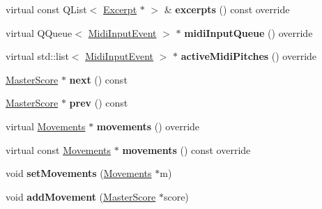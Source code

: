 \begin{DoxyCompactItemize}
\mbox{\label{class_ms_1_1_master_score_aeb1b90b68642106c2dad7449dc36b3de}} 
virtual const Q\+List$<$ \hyperlink{class_ms_1_1_excerpt}{Excerpt} $\ast$ $>$ \& {\bfseries excerpts} () const override
\item 
\mbox{\label{class_ms_1_1_master_score_a7d5f75c10fce6694d6ce139f7e2ab547}} 
virtual Q\+Queue$<$ \hyperlink{struct_ms_1_1_midi_input_event}{Midi\+Input\+Event} $>$ $\ast$ {\bfseries midi\+Input\+Queue} () override
\item 
\mbox{\label{class_ms_1_1_master_score_a981c6bbbd5cf1ffc1572351a2faeb9d5}} 
virtual std\+::list$<$ \hyperlink{struct_ms_1_1_midi_input_event}{Midi\+Input\+Event} $>$ $\ast$ {\bfseries active\+Midi\+Pitches} () override
\item 
\mbox{\label{class_ms_1_1_master_score_ae0a51d4f28d2e35443f6ced76c932b99}} 
\hyperlink{class_ms_1_1_master_score}{Master\+Score} $\ast$ {\bfseries next} () const
\item 
\mbox{\label{class_ms_1_1_master_score_a18188933c207238b8d15d48478bd52ac}} 
\hyperlink{class_ms_1_1_master_score}{Master\+Score} $\ast$ {\bfseries prev} () const
\item 
\mbox{\label{class_ms_1_1_master_score_a15c525dbfdfc64bc65ec97202bd71777}} 
virtual \hyperlink{class_ms_1_1_movements}{Movements} $\ast$ {\bfseries movements} () override
\item 
\mbox{\label{class_ms_1_1_master_score_ac22a31359d5f3f6fbaef40dc5bd2e7ed}} 
virtual const \hyperlink{class_ms_1_1_movements}{Movements} $\ast$ {\bfseries movements} () const override
\item 
\mbox{\label{class_ms_1_1_master_score_acc636fe922dacb94bb84940cba3cb49a}} 
void {\bfseries set\+Movements} (\hyperlink{class_ms_1_1_movements}{Movements} $\ast$m)
\item 
\mbox{\label{class_ms_1_1_master_score_add054287e982f0b44e9f5c2e8e36076b}} 
void {\bfseries add\+Movement} (\hyperlink{class_ms_1_1_master_score}{Master\+Score} $\ast$score)

\end{DoxyCompactItemize}
